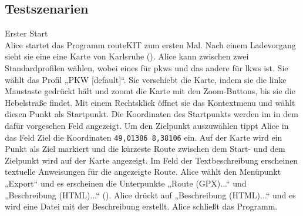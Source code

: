 \documentclass[a4paper, 11pt]{article}
\makeatletter
\def\namedlabel#1#2{\begingroup
    #2%
    \def\@currentlabel{#2}%
    \phantomsection\label{#1}\endgroup
}
\newcommand{\oitem}[2]{
  \@ifundefined{c@oitem#1}{\newcounter{oitem#1}}{} %
  \addtocounter{oitem#1}{10}
  \item[\namedlabel{#1:#2}{/#1\arabic{oitem#1}/}]
}
\makeatother
\begin{document}
\begin{description}



\end{description}
\subsection{Testszenarien}
\begin{description}
\oitem{TS}{ersterStart} Erster Start\\
Alice startet das Programm routeKIT zum ersten Mal. Nach einem Ladevorgang sieht sie eine eine Karte von Karlsruhe (). Alice kann zwischen zwei Standardprofilen wählen, wobei eines für \glspl{pkw} und das andere für \glspl{lkw} ist.
Sie wählt das Profil „PKW [default]“. Sie verschiebt die Karte, indem sie die linke Maustaste gedrückt hält und zoomt die Karte mit den Zoom-Buttons, bis sie die Hebelstraße findet. 
Mit einem Rechtsklick öffnet sie das Kontextmenu und wählt diesen Punkt als Startpunkt. Die Koordinaten des Startpunkts werden im in dem dafür vorgesehen Feld angezeigt. Um den Zielpunkt auszuwählen tippt Alice in das Feld Ziel die Koordinaten \texttt{49,01386 8,38106} ein. 
Auf der Karte wird ein Punkt als Ziel markiert und die kürzeste Route zwischen dem Start- und dem Zielpunkt wird auf der Karte angezeigt. Im Feld der Textbeschreibung erscheinen textuelle Anweisungen für die angezeigte Route. Alice wählt den Menüpunkt „Export“ und es erscheinen die Unterpunkte „Route (GPX)...“ und  „Beschreibung (HTML)...“ (). Alice drückt auf  „Beschreibung (HTML)...“ und es wird eine Datei mit der Beschreibung erstellt. Alice schließt das Programm.



\end{description}
\end{document}
